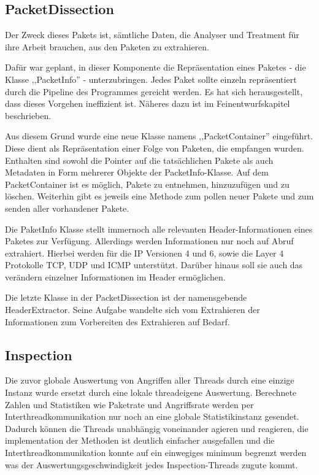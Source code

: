\documentclass[../review_2.tex]{subfiles}
\begin{document}
\subsection{PacketDissection}
Der  Zweck dieses Pakets ist, sämtliche Daten, die Analyser und Treatment für ihre Arbeit brauchen, aus den Paketen zu extrahieren. 

Dafür war geplant, in dieser Komponente die Repräsentation eines Paketes - die Klasse ,,PacketInfo'' - unterzubringen. Jedes Paket sollte einzeln repräsentiert durch die Pipeline des Programmes gereicht werden. Es hat sich herausgestellt, dass dieses Vorgehen ineffizient ist. Näheres dazu ist im Feinentwurfskapitel beschrieben. 

Aus diesem Grund wurde eine neue Klasse namens ,,PacketContainer'' eingeführt. Diese dient als Repräsentation einer Folge von Paketen, die empfangen wurden. Enthalten sind sowohl die Pointer auf die tatsächlichen Pakete als auch Metadaten in Form mehrerer Objekte der PacketInfo-Klasse. Auf dem PacketContainer ist es möglich, Pakete zu entnehmen, hinzuzufügen und zu löschen. Weiterhin gibt es jeweils eine Methode zum pollen neuer Pakete und zum senden aller vorhandener Pakete. %

Die PaketInfo Klasse stellt immernoch alle relevanten Header-Informationen eines Paketes zur Verfügung. Allerdings werden Informationen nur noch auf Abruf extrahiert. Hierbei werden für die IP Versionen 4 und 6, sowie die Layer 4 Protokolle TCP, UDP und ICMP unterstützt. Darüber hinaus soll sie auch das verändern einzelner Informationen im Header ermöglichen.


Die letzte Klasse in der PacketDissection ist der namensgebende HeaderExtractor. Seine Aufgabe wandelte sich vom Extrahieren der Informationen zum Vorbereiten des Extrahieren auf Bedarf.

\subsection{Inspection}

Die zuvor globale Auswertung von Angriffen aller Threads durch eine einzige Instanz wurde ersetzt durch eine lokale threadeigene Auswertung. Berechnete Zahlen und Statistiken wie Paketrate und Angriffsrate werden per Interthreadkommunikation nur noch an eine globale Statistikinstanz gesendet. Dadurch können die Threads unabhängig voneinander agieren und reagieren, die implementation der Methoden ist deutlich einfacher ausgefallen und die Interthreadkommunikation konnte auf ein einwegiges minimum begrenzt werden was der Auswertungsgeschwindigkeit jedes Inspection-Threads zugute kommt.
\end{document}
